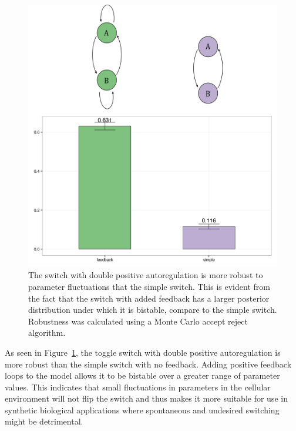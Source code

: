 \begin{figure}[h]
\centering
\includegraphics[scale=0.5]{chapterModelling/images/MA_robustness_cartoon.png}
\caption[The robustness of the double positive and the simple switch mass action models]{The switch with double positive autoregulation is more robust to parameter fluctuations that the simple switch. This is evident from the fact that the switch with added feedback has a larger posterior distribution under which it is bistable, compare to the simple switch. Robustness was calculated using a Monte Carlo accept reject algorithm. }
\label{fig:robust_std_doubpos}
\end{figure}
As seen in Figure~\ref{fig:robust_std_doubpos}, the toggle switch with double positive autoregulation is more robust than the simple switch with no feedback. Adding positive feedback loops to the model allows it to be bistable over a greater range of parameter values. This indicates that small fluctuations in parameters in the cellular environment will not flip the switch and thus makes it more suitable for use in synthetic biological applications where spontaneous and undesired switching might be detrimental. 


